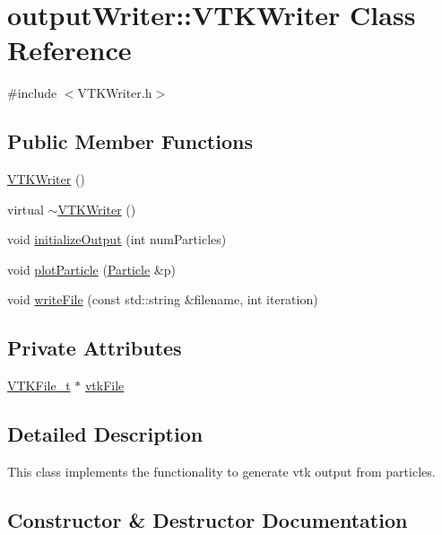 \hypertarget{classoutputWriter_1_1VTKWriter}{}\section{output\+Writer\+:\+:V\+T\+K\+Writer Class Reference}
\label{classoutputWriter_1_1VTKWriter}


{\ttfamily \#include $<$V\+T\+K\+Writer.\+h$>$}

\subsection*{Public Member Functions}
\begin{DoxyCompactItemize}
\item 
\hyperlink{classoutputWriter_1_1VTKWriter_a448311c322544e40c6e0a3c158924583}{V\+T\+K\+Writer} ()
\item 
virtual \hyperlink{classoutputWriter_1_1VTKWriter_a196a54bcfa3f93638ef292c386f91b61}{$\sim$\+V\+T\+K\+Writer} ()
\item 
void \hyperlink{classoutputWriter_1_1VTKWriter_a41cfcefce4d7eb434f1dd45f5aeb3e8f}{initialize\+Output} (int num\+Particles)
\item 
void \hyperlink{classoutputWriter_1_1VTKWriter_a6d3f50ca3ae2390055d3f9cc0ed1eb4d}{plot\+Particle} (\hyperlink{classParticle}{Particle} \&p)
\item 
void \hyperlink{classoutputWriter_1_1VTKWriter_ad0d7afb78a2027d05e9a03acde3799dd}{write\+File} (const std\+::string \&filename, int iteration)
\end{DoxyCompactItemize}
\subsection*{Private Attributes}
\begin{DoxyCompactItemize}
\item 
\hyperlink{classVTKFile__t}{V\+T\+K\+File\+\_\+t} $\ast$ \hyperlink{classoutputWriter_1_1VTKWriter_ab654ea4308b92e5dbdcd9a6833d5ed30}{vtk\+File}
\end{DoxyCompactItemize}


\subsection{Detailed Description}
This class implements the functionality to generate vtk output from particles. 

\subsection{Constructor \& Destructor Documentation}
